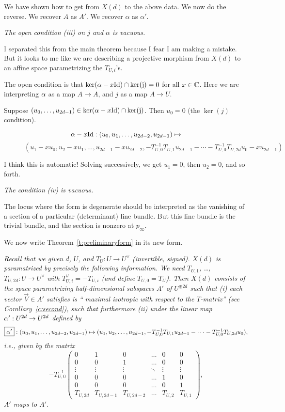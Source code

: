 {\bpf
We have shown how to get from $X(d)$ to the above data.  We now do the reverse.
We recover $A$ as $A'$.  We recover $\alpha$ as $\alpha'$.  \epf


 {\em The open condition (iii) on
  $j$ and $\alpha$  is vacuous.}

I separated this from the main theorem because I fear I am making
a mistake.  But it looks to me like we are describing a projective
morphism from $X(d)$ to an affine space parametrizing the $T_{U,i}$'s.

\bpf
The open condition is that $\ker(\alpha -x \rm{Id}) \cap \ker(j) =0$
for all $x \in \mathbb{C}$.  Here we are interpreting $\alpha$ as a map $A \rightarrow A$,
and $j$ as a map $A \rightarrow U$.

Suppose $(u_0, \dots, u_{2d-1}) \in \ker(\alpha -x \rm{Id}) \cap \ker(j)$.
Then $u_0=0$ (the $\ker(j)$ condition).

$${\alpha-x\rm{Id}}: (u_0, u_1, \dots, u_{2d-2}, u_{2d-1}) \mapsto$$
$$ \quad \quad \quad
 (u_1-xu_0, u_2-xu_1, \dots, u_{2d-1} - x u_{2d-2},
 -T^{-1}_{U,0} T_{U,1} u_{2d-1}  - \cdots  -T^{-1}_{U,0} T_{U,2d} u_0 -xu_{2d-1})$$

 I think this is automatic!  Solving successively, we get $u_1=0$, then $u_2=0$, and so forth.

 \epf

 {\em The condition (iv) is vacuous.}

\bpf  The locus where the form is degenerate should be interpreted as the vanishing of a section of a particular (determinant) line bundle.  But this line bundle is the trivial bundle, and the section is nonzero at $p_\infty$. \epf

We now write Theorem~\ref{t:preliminaryform} in its new form.

  \label{t:preliminaryform}{\em Recall that we given $d$, $U$, and $T_U: U \rightarrow U^\vee$ (invertible, signed).
  $X(d)$ is paramatrized by precisely the following information.
 We need $T_{U,1}$, \dots, $T_{U,2d}: U \rightarrow U^\vee$ with $T_{U,i}^\vee = - T_{U,i}$ (and define $T_{U,0}=T_U$). Then $X(d)$ consists of the space parametrizing half-dimensional subspaces $\boxed{A'}$ of $U^{\oplus 2d}$ such that (i) each vector $\vec{V} \in A'$ satisfies is `` maximal isotropic with respect to the $T$-matrix'' 
 (see Corollary~\ref{c:second}), such that furthermore
(ii)  under the linear map $\alpha' : U^{2d} \rightarrow U^{2d}$ defined by  $$\boxed{\alpha'}: (u_0, u_1, \dots, u_{2d-2}, u_{2d-1}) \mapsto
 (u_1, u_2, \dots, u_{2d-1},
 -T^{-1}_{U,0} T_{U,1} u_{2d-1}  - \cdots  -T^{-1}_{U,0} T_{U,2d} u_0 ),$$
 i.e., given by the matrix 
$$ -T^{-1}_{U,0}
\begin{pmatrix}
  0 & 1  & 0 & \hdots &       0 &  0 \\
  0 & 0 &  1 & \hdots &       0 &  0 \\
\vdots & \vdots & \vdots & \ddots & \vdots & \vdots \\
  0 & 0 &  0 & \hdots &       1 &  0 \\
  0 & 0 &  0 & \hdots &       0 &  1 \\
 T_{U,2d} & T_{U,2d-1} & T_{U,2d-2} & \hdots & T_{U,2} & T_{U,1} 
  \end{pmatrix},
$$
 $A'$ maps to $A'$.  
}


}
